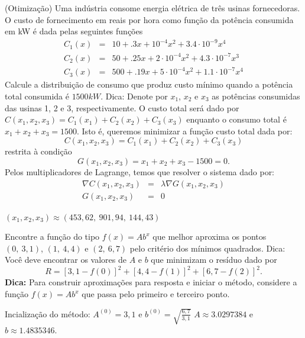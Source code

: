 \begin{exer}(Otimização)\label{nlinsis:usinas} Uma indústria consome energia elétrica de três usinas fornecedoras. O custo de fornecimento em reais por hora como função da potência consumida em kW é dada pelas seguintes funções
\begin{eqnarray*}
C_1(x)&=&10+.3x+10^{-4}x^2+3.4\cdot 10^{-9}x^4\\
C_2(x)&=&50+.25x+2\cdot 10^{-4}x^2+4.3\cdot 10^{-7}x^3\\
C_3(x)&=&500+.19x+5\cdot 10^{-4}x^2+1.1\cdot 10^{-7}x^4
\end{eqnarray*}
Calcule a distribuição de consumo que produz custo mínimo quando a potência total consumida é $1500kW$. Dica: Denote por $x_1$, $x_2$ e $x_3$ as potências consumidas das usinas 1, 2 e 3, respectivamente.  O custo total será dado por $C(x_1,x_2,x_3)=C_1(x_1)+C_2(x_2)+C_3(x_3)$ enquanto o consumo total é $x_1+x_2+x_3=1500$. Isto é, queremos minimizar a função custo total dada por:
$$C(x_1,x_2,x_3)=C_1(x_1)+C_2(x_2)+C_3(x_3)$$
restrita à condição
$$G(x_1,x_2,x_3)=x_1+x_2+x_3-1500=0.$$
Pelos multiplicadores de Lagrange, temos que resolver o sistema dado por:
\begin{eqnarray*}
\nabla C(x_1,x_2,x_3) &=& \lambda \nabla G(x_1,x_2,x_3)\\
G(x_1,x_2,x_3)&=&0
\end{eqnarray*}
\end{exer}

\begin{resp}
 $(x_1,x_2,x_3)\approx (453,62,~ 901,94,~ 144,43)$
\end{resp}


\begin{exer} \label{nlinsis:prob_ajuste_eax} Encontre a função do tipo $f(x)=Ab^{x}$ que melhor aproxima os pontos $(0,~3,1)$, $(1,~4,4)$ e $(2,~6,7)$ pelo critério dos mínimos quadrados. Dica: Você deve encontrar os valores de $A$ e $b$ que minimizam o resíduo dado por
$$R=\left[3,1-f(0)\right]^2+\left[4,4-f(1)\right]^2+\left[6,7-f(2)\right]^2.$$
{\bf Dica:} Para construir aproximações para resposta e iniciar o método, considere a função $f(x)=Ab^x$ que passa pelo primeiro e terceiro ponto.
\end{exer}
\begin{resp}
Incialização do método: $A^{(0)}= 3,1$ e $b^{(0)}= \sqrt{\frac{6,7}{3,1}}$
$A\approx  3.0297384 $ e $b\approx 1.4835346$.
\end{resp}


